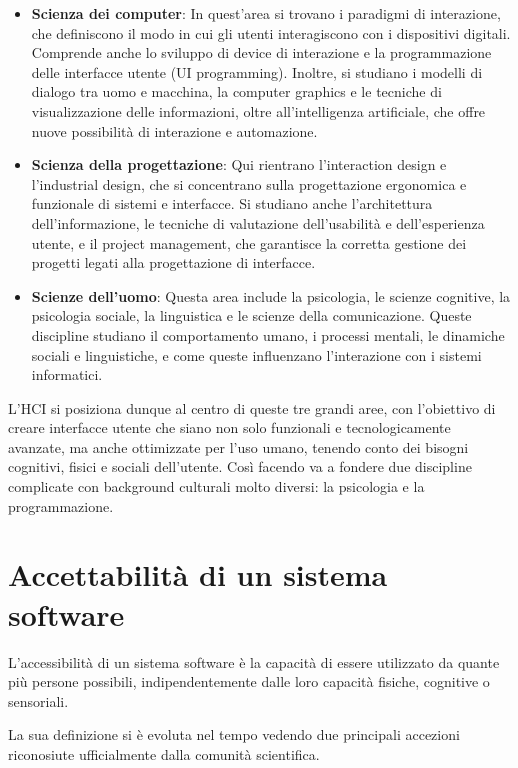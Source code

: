 \documentclass{report}
\begin{document}
	\begin{itemize}
    	\item \textbf{Scienza dei computer}: In quest'area si trovano i paradigmi di interazione, che definiscono il modo in cui gli utenti interagiscono con i dispositivi digitali. Comprende anche lo sviluppo di device di interazione e la programmazione delle interfacce utente (UI programming). Inoltre, si studiano i modelli di dialogo tra uomo e macchina, la computer graphics e le tecniche di visualizzazione delle informazioni, oltre all'intelligenza artificiale, che offre nuove possibilità di interazione e automazione. 
    	
    	\item \textbf{Scienza della progettazione}: Qui rientrano l'interaction design e l'industrial design, che si concentrano sulla progettazione ergonomica e funzionale di sistemi e interfacce. Si studiano anche l'architettura dell'informazione, le tecniche di valutazione dell'usabilità e dell'esperienza utente, e il project management, che garantisce la corretta gestione dei progetti legati alla progettazione di interfacce.
    	
    	\item \textbf{Scienze dell'uomo}: Questa area include la psicologia, le scienze cognitive, la psicologia sociale, la linguistica e le scienze della comunicazione. Queste discipline studiano il comportamento umano, i processi mentali, le dinamiche sociali e linguistiche, e come queste influenzano l'interazione con i sistemi informatici. 
	\end{itemize}
	L'HCI si posiziona dunque al centro di queste tre grandi aree, con l'obiettivo di creare interfacce utente che siano non solo funzionali e tecnologicamente avanzate, ma anche ottimizzate per l'uso umano, tenendo conto dei bisogni cognitivi, fisici e sociali dell'utente. Così facendo va a fondere due discipline complicate con background culturali molto diversi: la psicologia e la programmazione.

	\chapter{Accettabilità di un sistema software}
	L'accessibilità di un sistema software è la capacità di essere utilizzato da quante più persone possibili, indipendentemente dalle loro capacità fisiche, cognitive o sensoriali. 

	La sua definizione si è evoluta nel tempo vedendo due principali accezioni riconosiute ufficialmente dalla comunità scientifica.
\end{document}
